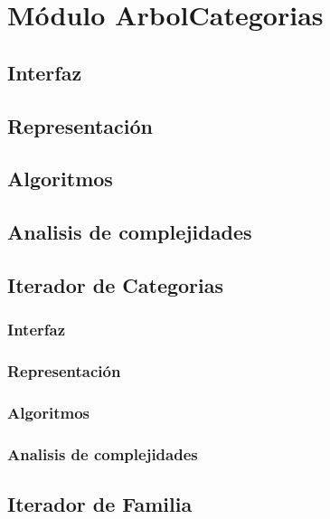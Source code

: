 \documentclass[12pt, a4paper]{article}
\begin{document}
\maketitle
\tableofcontents
\newpage

\section{Módulo ArbolCategorias} 
\subsection{Interfaz}

\subsection{Representaci\'on}

\subsection{Algoritmos}

\subsection{Analisis de complejidades}


\subsection{Iterador de Categorias} 
\subsubsection{Interfaz}

\subsubsection{Representaci\'on}

\subsubsection{Algoritmos}

\subsubsection{Analisis de complejidades}


\subsection{Iterador de Familia} 
\end{document}
